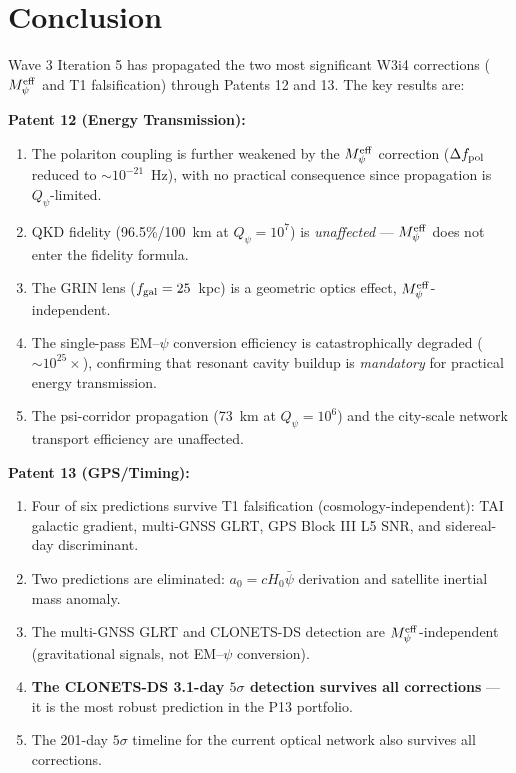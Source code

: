\documentclass[aps,prd,twocolumn,superscriptaddress,nofootinbib]{revtex4-2}
\newcommand{\Qpsi}{Q_\psi}
\newcommand{\Meff}{M_\psi^{\rm eff}}
\begin{document}
\section{Conclusion}
\label{sec:conclusion}

Wave 3 Iteration 5 has propagated the two most significant W3i4
corrections ($\Meff$ and T1 falsification) through Patents 12 and 13.
The key results are:

\textbf{Patent 12 (Energy Transmission):}
\begin{enumerate}
\item The polariton coupling is further weakened by the $\Meff$ correction
  ($\Delta f_{\rm pol}$ reduced to $\sim 10^{-21}$~Hz), with no practical
  consequence since propagation is $\Qpsi$-limited.
\item QKD fidelity (96.5\%/100~km at $\Qpsi = 10^7$) is \emph{unaffected}
  --- $\Meff$ does not enter the fidelity formula.
\item The GRIN lens ($f_{\rm gal} = 25$~kpc) is a geometric optics
  effect, $\Meff$-independent.
\item The single-pass EM--$\psi$ conversion efficiency is catastrophically
  degraded ($\sim 10^{25}\times$), confirming that resonant cavity
  buildup is \emph{mandatory} for practical energy transmission.
\item The psi-corridor propagation (73~km at $\Qpsi = 10^6$) and the
  city-scale network transport efficiency are unaffected.
\end{enumerate}

\textbf{Patent 13 (GPS/Timing):}
\begin{enumerate}
\item Four of six predictions survive T1 falsification (cosmology-independent):
  TAI galactic gradient, multi-GNSS GLRT, GPS Block III L5 SNR, and
  sidereal-day discriminant.
\item Two predictions are eliminated: $a_0 = cH_0\bar{\psi}$ derivation
  and satellite inertial mass anomaly.
\item The multi-GNSS GLRT and CLONETS-DS detection are $\Meff$-independent
  (gravitational signals, not EM--$\psi$ conversion).
\item \textbf{The CLONETS-DS 3.1-day $5\sigma$ detection survives all
  corrections} --- it is the most robust prediction in the P13 portfolio.
\item The 201-day $5\sigma$ timeline for the current optical network
  also survives all corrections.
\end{enumerate}
\end{document}
